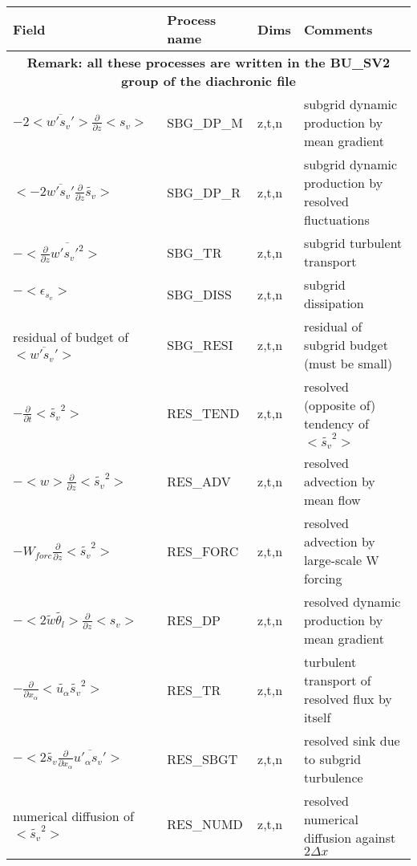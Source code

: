 \begingroup
\renewcommand\arraystretch{1.5}
\begin{longtable}[c]{|p{}|p{}|p{}|p{}|}
\hline
Field & Process name & Dims & Comments \\
\hline \hline
\endhead
\multicolumn{4}{|c|}{\textbf{Remark: all these processes are written in the BU\_SV2 group of the diachronic file}} \\
\hline
\endfoot
$- 2 <\overline{w's_v'}>\frac{\partial }{\partial z}<s_v>$         & SBG\_DP\_M & z,t,n & subgrid dynamic production by mean gradient \\\hline
$<-2 \overline{w's_v'}\frac{\partial}{\partial z}\tilde{s_v}>$     & SBG\_DP\_R & z,t,n & subgrid dynamic production by resolved fluctuations\\\hline
$-<\frac{\partial}{\partial z}\overline{w's_v'^2}>$                & SBG\_TR    & z,t,n & subgrid turbulent transport\\\hline
$-<\epsilon_{s_v}>$                                                & SBG\_DISS  & z,t,n & subgrid dissipation \\\hline
{\rm residual of budget of} $<\overline{w's_v'}>$                  & SBG\_RESI  & z,t,n & residual of subgrid budget (must be small) \\\hline
$-\frac{\partial }{\partial t}<\tilde{s_v}^2>$                     & RES\_TEND  & z,t,n & resolved (opposite of) tendency of $<\tilde{s_v}^2>$\\\hline
$-<w>\frac{\partial}{\partial z}<\tilde{s_v}^2>$                   & RES\_ADV   & z,t,n & resolved advection by mean flow\\\hline
$-W_{forc}\frac{\partial}{\partial z}<\tilde{s_v}^2>$              & RES\_FORC  & z,t,n & resolved advection by large-scale W forcing\\\hline
$-< 2 \tilde{w}\tilde{\theta_l}>\frac{\partial }{\partial z}<s_v>$ & RES\_DP    & z,t,n & resolved dynamic production by mean gradient \\\hline
$-\frac{\partial}{\partial x_\alpha} <\tilde{u_\alpha} \tilde{s_v}^2>$ & RES\_TR   & z,t,n & turbulent transport of resolved flux by itself \\\hline
$- <2 \tilde{s_v}\frac{\partial}{\partial x_\alpha}\overline{u'_\alpha s_v'}>$ & RES\_SBGT & z,t,n & resolved sink due to subgrid turbulence \\\hline
{\rm numerical diffusion of } $<\tilde{s_v}^2>$                    & RES\_NUMD  & z,t,n & resolved numerical diffusion against $2\Delta x$ \\\hline

\end{longtable}
